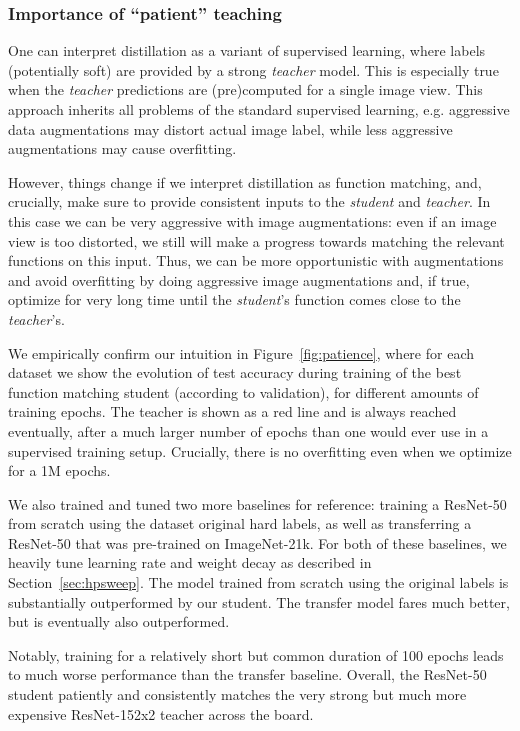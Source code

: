 \documentclass[10pt,twocolumn,letterpaper]{article}
\begin{document}
\subsubsection{Importance of ``patient'' teaching}

One can interpret distillation as a variant of supervised learning, where labels (potentially soft) are provided by a strong \emph{teacher} model. This is especially true when the \emph{teacher} predictions are (pre)computed for a single image view. This approach inherits all problems of the standard supervised learning, e.g. aggressive data augmentations may distort actual image label, while less aggressive augmentations may cause overfitting.

However, things change if we interpret distillation as function matching, and, crucially, make sure to provide consistent inputs to the \emph{student} and \emph{teacher}. In this case we can be very aggressive with image augmentations: even if an image view is too distorted, we still will make a progress towards matching the relevant functions on this input. Thus, we can be more opportunistic with augmentations and avoid overfitting by doing aggressive image augmentations and, if true, optimize for very long time until the \emph{student}'s function comes close to the \emph{teacher}'s. 

We empirically confirm our intuition in Figure~\ref{fig:patience}, where for each dataset we show the evolution of test accuracy during training of the best function matching student (according to validation), for different amounts of training epochs.
The teacher is shown as a red line and is always reached eventually, after a much larger number of epochs than one would ever use in a supervised training setup.
Crucially, there is no overfitting even when we optimize for a 1M epochs.

We also trained and tuned two more baselines for reference: training a ResNet-50 from scratch using the dataset original hard labels, as well as transferring a ResNet-50 that was pre-trained on ImageNet-21k.
For both of these baselines, we heavily tune learning rate and weight decay as described in Section~\ref{sec:hpsweep}.
The model trained from scratch using the original labels is substantially outperformed by our student.
The transfer model fares much better, but is eventually also outperformed.

Notably, training for a relatively short but common duration of 100 epochs leads to much worse performance than the transfer baseline.
Overall, the ResNet-50 student patiently and consistently matches the very strong but much more expensive ResNet-152x2 teacher across the board.
\end{document}
